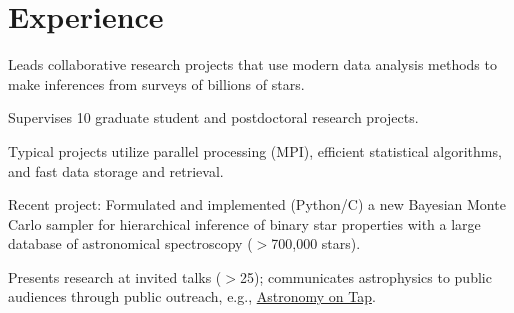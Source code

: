 \documentclass[letterpaper,12pt]{deedy-resume} %
\begin{document}
\begin{minipage}[t]{0.64\textwidth} %


\section{Experience}


\vspace{1.5\topsep} %
\begin{tightitemize}
    \item Leads collaborative research projects that use modern data analysis methods to make inferences from surveys of billions of stars.
    \item Supervises 10 graduate student and postdoctoral research projects.
    \item Typical projects utilize parallel processing (MPI), efficient statistical algorithms, and fast data storage and retrieval.
    \item Recent project: Formulated and implemented (Python/C) a new Bayesian Monte Carlo sampler for hierarchical inference of binary star properties with a large database of astronomical spectroscopy ($>$700,000 stars).
    \item Presents research at invited talks ($>$25); communicates astrophysics to public audiences through public outreach, e.g., \href{https://astronomyontap.org/}{Astronomy on Tap}.
\end{tightitemize}

\sectionspace %



\end{minipage}
\end{document}
